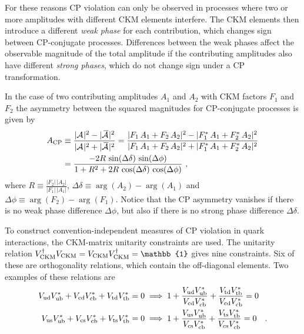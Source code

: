 For these reasons CP violation can only be observed in processes where two or more amplitudes with different CKM elements interfere. The
CKM elements then introduce a different \emph{weak phase} for each contribution, which changes sign between CP-conjugate processes.
Differences between the weak phases affect the observable magnitude of the total amplitude if the contributing amplitudes also have
different \emph{strong phases}, which do not change sign under a CP transformation.

In the case of two contributing amplitudes $A_1$ and $A_2$ with CKM factors $F_1$ and $F_2$ the asymmetry between the squared magnitudes
for CP-conjugate processes is given by
\begin{equation}
  \begin{split}
    A_\text{CP} &\equiv \frac{|\Af[]|^2 - |\Abarf[]|^2}{|\Af[]|^2 + |\Abarf[]|^2}
                 = \frac{|F_1\,A_1 + F_2\,A_2|^2 - |F_1^*\,A_1 + F_2^*\,A_2|^2}{|F_1\,A_1 + F_2\,A_2|^2 + |F_1^*\,A_1 + F_2^*\,A_2|^2} \\
                &= \frac{-2 R\, \sin(\Delta\delta)\, \sin(\Delta\phi)}{1 + R^2 + 2 R\, \cos(\Delta\delta)\, \cos(\Delta\phi)}
                   \ ,
  \end{split}
\end{equation}
where $R\equiv\frac{|F_2|\,|A_2|}{|F_1|\,|A_1|}$, $\Delta\delta\equiv\arg(A_2)-\arg(A_1)$ and $\Delta\phi\equiv\arg(F_2)-\arg(F_1)$. Notice
that the CP asymmetry vanishes if there is no weak phase difference $\Delta\phi$, but also if there is no strong phase difference
$\Delta\delta$.

To construct convention-independent measures of CP violation in quark interactions, the CKM-matrix unitarity constraints are used. The
unitarity relation $\VCKM^\dagger\VCKM = \VCKM\VCKM^\dagger = \mathbb{1}$ gives nine constraints. Six of these are orthogonality
relations, which contain the off-diagonal elements. Two examples of these relations are
\begin{subequations}
  \label{eq:unitConstraints}
  \begin{align}
    \label{eq:unitConstraints_d}
    \Vud\Vub^* + \Vcd\Vcb^* + \Vtd\Vtb^* = 0 &\implies 1 + \frac{\Vud\Vub^*}{\Vcd\Vcb^*} + \frac{\Vtd\Vtb^*}{\Vcd\Vcb^*} = 0 \\
    \label{eq:unitConstraints_s}
    \Vus\Vub^* + \Vcs\Vcb^* + \Vts\Vtb^* = 0 &\implies 1 + \frac{\Vus\Vub^*}{\Vcs\Vcb^*} + \frac{\Vts\Vtb^*}{\Vcs\Vcb^*} = 0
    \quad.
  \end{align}
\end{subequations}

